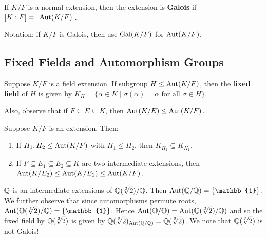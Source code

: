 \documentclass[12pt]{article}
\begin{document}
 If $K/F$ is a normal extension, then the extension is \textbf{Galois} if $[K:F]=|\operatorname{Aut}(K/F)|$.

\rmk Notation: if $K/F$ is Galois, then use $\operatorname{Gal}(K/F)$ for $\operatorname{Aut}(K/F)$.

\subsection{Fixed Fields and Automorphism Groups}
 Suppose $K/F$ is a field extension. If subgroup $H\leq \operatorname{Aut}(K/F)$, then the \textbf{fixed field} of $H$ is given by $K_H = \{\alpha\in K \mid \sigma(\alpha)=\alpha \text{ for all } \sigma\in H\}$. 

\rmk Also, observe that if $F\subseteq E\subseteq K$, then $\operatorname{Aut}(K/E)\leq \operatorname{Aut}(K/F)$.

\begin{lemma}
    Suppose $K/F$ is an extension. Then: \begin{enumerate}[label=(\arabic{*})]
        \item If $H_1,H_2\leq \operatorname{Aut}(K/F)$ with $H_1\leq H_2$, then $K_{H_2}\subseteq K_{H_1}$.
        \item If $F\subseteq E_1\subseteq E_2\subseteq K$ are two intermediate extensions, then $\operatorname{Aut}(K/E_2)\leq \operatorname{Aut}(K/E_1) \leq \operatorname{Aut}(K/F)$.
    \end{enumerate}
\end{lemma}

\eg $\mathbb{Q}$ is an intermediate extensions of $\mathbb{Q}(\sqrt[3]{2})/\mathbb{Q}$. Then $\Aut(\Q/\Q)=\{\mathbb{1}\}$. We further observe that since automorphisms permute roots, $\Aut(\Q(\sqrt[3]{2})/\Q) = \{\mathbb{1}\}$. Hence $\operatorname{Aut}(\mathbb{Q}/\mathbb{Q})=\operatorname{Aut}(\mathbb{Q}(\sqrt[3]{2})/\mathbb{Q})$ and so the fixed field by $\mathbb{Q}(\sqrt[3]{2})$ is given by $\mathbb{Q}(\sqrt[3]{2})_{\operatorname{Aut}(\mathbb{Q}/\mathbb{Q})}=\mathbb{Q}(\sqrt[3]{2})$. We note that $\mathbb{Q}(\sqrt[3]{2})$ is not Galois!
\end{document}
